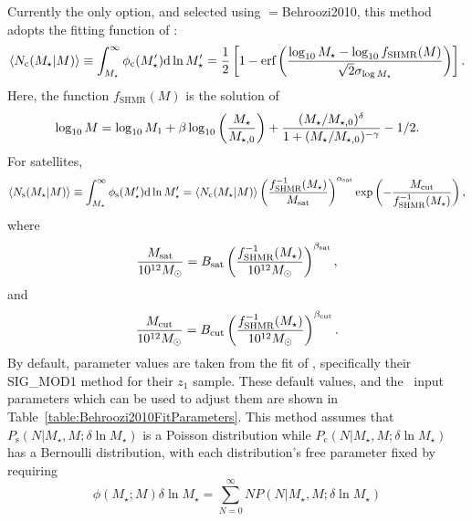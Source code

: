 Currently the only option, and selected using {\normalfont \ttfamily [conditionalStellarMassFunctionMethod]}$=${\normalfont \ttfamily Behroozi2010}, this method adopts the fitting function of \cite{behroozi_comprehensive_2010}:
\begin{equation}
 \langle N_\mathrm{c}(M_\star|M)\rangle \equiv \int_{M_\star}^\infty \phi_\mathrm{c}(M_\star^\prime) \d \ln M_\star^\prime = {1 \over 2} \left[ 1 - \hbox{erf}\left( {\log_{10}M_\star - \log_{10} f_\mathrm{SHMR}(M) \over \sqrt{2}\sigma_{\log M_\star}} \right) \right].
\end{equation}
Here, the function $f_\mathrm{SHMR}(M)$ is the solution of
\begin{equation}
 \log_{10}M = \log_{10}M_1 + \beta \log_{10}\left({M_\star \over M_{\star,0}}\right) + {(M_\star/M_{\star,0})^\delta \over 1 + (M_\star/M_{\star,0})^{-\gamma}} - {1/2}.
\end{equation}
For satellites,
\begin{equation}
 \langle N_\mathrm{s}(M_\star|M)\rangle \equiv \int_{M_\star}^\infty \phi_\mathrm{s}(M_\star^\prime) \d \ln M_\star^\prime =  \langle N_\mathrm{c}(M_\star|M)\rangle \left({f^{-1}_\mathrm{SHMR}(M_\star) \over M_\mathrm{sat}}\right)^{\alpha_\mathrm{sat}} \exp\left(- {M_\mathrm{cut} \over f^{-1}_\mathrm{SHMR}(M_\star)} \right),
\end{equation}
where
\begin{equation}
 {M_\mathrm{sat} \over 10^{12} M_\odot} = B_\mathrm{sat} \left({f^{-1}_\mathrm{SHMR}(M_\star) \over 10^{12} M_\odot}\right)^{\beta_\mathrm{sat}},
\end{equation}
and
\begin{equation}
 {M_\mathrm{cut} \over 10^{12} M_\odot} = B_\mathrm{cut} \left({f^{-1}_\mathrm{SHMR}(M_\star) \over 10^{12} M_\odot}\right)^{\beta_\mathrm{cut}}.
\end{equation}
By default, parameter values are taken from the fit of \cite{leauthaud_new_2011}, specifically their {\normalfont \ttfamily SIG\_MOD1} method for their $z_1$ sample. These default values, and the \glc\ input parameters which can be used to adjust them are shown in Table~\ref{table:Behroozi2010FitParameters}. This method assumes that $P_\mathrm{s}(N|M_\star,M;\delta \ln M_\star)$ is a Poisson distribution while $P_\mathrm{c}(N|M_\star,M;\delta \ln M_\star)$ has a Bernoulli distribution, with each distribution's free parameter fixed by requiring
\begin{equation}
 \phi(M_\star;M) \delta \ln M_\star = \sum_{N=0}^\infty N P(N|M_\star,M;\delta \ln M_\star)
\end{equation}

